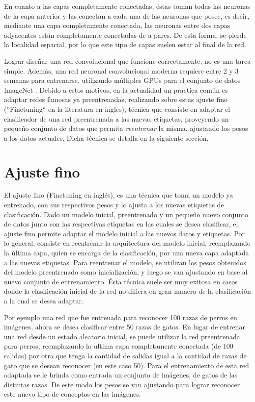 \documentclass[a4paper,11pt,spanish]{book}
\begin{document}
      En cuanto a las capas completamente conectadas, éstas toman todas las neuronas de la capa anterior y las conectan a cada una de las neuronas que posee, es decir,
      mediante una capa completamente conectada, las neuronas entre dos capas adyacentes están completamente conectadas de a pares. De esta forma, se pierde la localidad espacial,
      por lo que este tipo de capas suelen estar al final de la red.
      
      Lograr diseñar una red convolucional que funcione correctamente, no es una tarea simple. Además, una red neuronal convolucional moderna requiere entre 2 y 3 semanas para entrenarse, 
      utilizando múltiples GPUs para el conjunto de datos ImageNet \cite{imagenet_cvpr09}. Debido a estos motivos, en la actualidad un practica común es adaptar
      redes famosas ya preentrenadas, realizando sobre estas ajuste fino (''Finetuning`` en la literatura en ingles), técnica que consiste en adaptar el clasificador de una 
      red preentrenada a las nuevas etiquetas, proveyendo un pequeño conjunto de datos que permita \emph{reentrenar} la misma, ajustando los pesos a los datos actuales.
      Dicha técnica se detalla en la siguiente sección.

    \section {Ajuste fino} \label{sec:finetuning}
      El ajuste fino (Finetuning en inglés), es una técnica que toma un modelo ya entrenado, con sus respectivos pesos y lo ajusta a los nuevas etiquetas de clasificación. 
      Dado un modelo inicial, preentrenado y un pequeño nuevo conjunto de datos junto con las respectivas etiquetas en las cuales se desea clasificar, el ajuste fino
      permite adaptar el modelo inicial a las nuevos datos y etiquetas.
      Por lo general, consiste en reentrenar la arquitectura del modelo inicial, reemplazando la última capa, quien se encarga de la clasificación, por una nueva capa
      adaptada a las nuevas etiquetas.
      Para reentrenar el modelo, se utilizan los pesos obtenidos del modelo preentrenado como inicialización, y luego se van ajustando en base al nuevo conjunto de entrenamiento.
      Ésta técnica suele ser muy exitosa en casos donde la clasificación inicial de la red no difiera en gran manera de la clasificación a la cual se desea adaptar.
      
      Por ejemplo una red que fue entrenada para reconocer 100 razas de perros en imágenes, ahora se desea clasificar entre 50 razas de gatos. 
      En lugar de entrenar una red desde un estado aleatorio inicial, se puede utilizar la red preentrenada para perros, reemplazando la ultima capa completamente conectada
      (de 100 salidas) por otra que tenga la cantidad de salidas igual a la cantidad de razas de gato que se desean reconocer (en este caso 50).
      Para el entrenamiento de esta red adaptada se le brinda como entrada un conjunto de imágenes, de gatos de las distintas razas. De este modo los pesos se van
      ajustando para lograr reconocer este nuevo tipo de conceptos en las imágenes.
 
\end{document}
